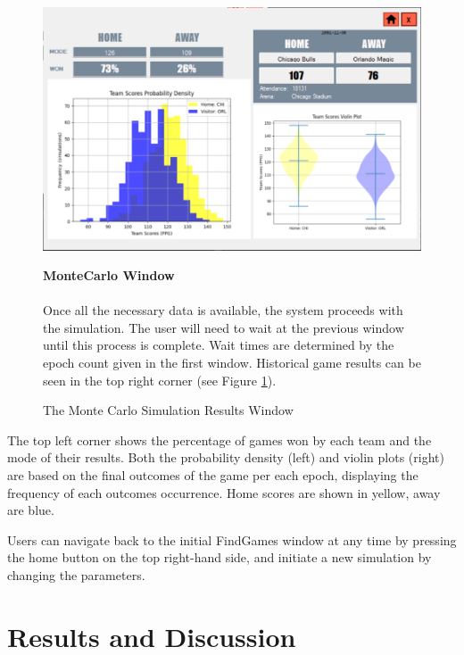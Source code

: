 \documentclass{thesis-ekf}
\theoremstyle{definition}
\theoremstyle{remark}
\begin{document}
\begin{figure}[h]
	\begin{minipage}{0.69\textwidth}
		\centering
		\includegraphics[width=\textwidth]{img/user-guide/MonteCarlo}
		\caption{The Monte Carlo Simulation Results Window}
		\label{img-montecarlo}
	\end{minipage}
	\hfill
	\begin{minipage}{0.28\textwidth}
		\textbf{MonteCarlo Window} \\ \\
		Once all the necessary data is available, the system proceeds with the simulation. The user will need to wait at the previous window until this process is complete. Wait times are determined by the epoch count given in the first window. 
		Historical game results can be seen in the top right corner (see Figure \ref{img-montecarlo}). 
	\end{minipage}
\end{figure}


The top left corner shows the percentage of games won by each team and the mode of their results. Both the probability density (left) and violin plots (right) are based on the final outcomes of the game per each epoch, displaying the frequency of each outcomes occurrence. Home scores are shown in yellow, away are blue.

Users can navigate back to the initial FindGames window at any time by pressing the home button on the top right-hand side, and initiate a new simulation by changing the parameters.


\chapter{Results and Discussion}
\end{document}
